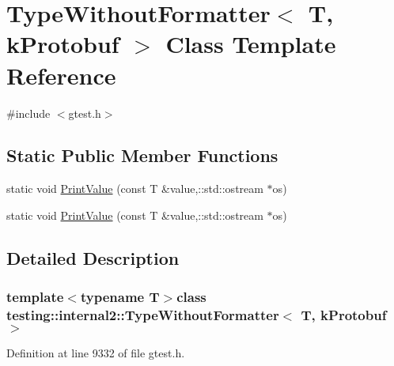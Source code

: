 \hypertarget{classtesting_1_1internal2_1_1TypeWithoutFormatter_3_01T_00_01kProtobuf_01_4}{\section{\-Type\-Without\-Formatter$<$ \-T, k\-Protobuf $>$ \-Class \-Template \-Reference}
\label{db/d4b/classtesting_1_1internal2_1_1TypeWithoutFormatter_3_01T_00_01kProtobuf_01_4}
}


{\ttfamily \#include $<$gtest.\-h$>$}

\subsection*{\-Static \-Public \-Member \-Functions}
\begin{DoxyCompactItemize}
\item 
static void \hyperlink{classtesting_1_1internal2_1_1TypeWithoutFormatter_3_01T_00_01kProtobuf_01_4_a3ac7770f918210bb197165f28880c544}{\-Print\-Value} (const \-T \&value,\-::std\-::ostream $\ast$os)
\item 
static void \hyperlink{classtesting_1_1internal2_1_1TypeWithoutFormatter_3_01T_00_01kProtobuf_01_4_a3ac7770f918210bb197165f28880c544}{\-Print\-Value} (const \-T \&value,\-::std\-::ostream $\ast$os)
\end{DoxyCompactItemize}


\subsection{\-Detailed \-Description}
\subsubsection*{template$<$typename T$>$class testing\-::internal2\-::\-Type\-Without\-Formatter$<$ T, k\-Protobuf $>$}



\-Definition at line 9332 of file gtest.\-h.



